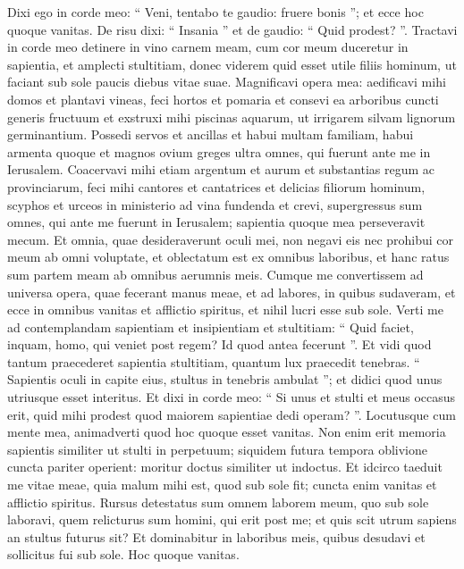 \begin{biblechapter}
\begin{biblechapter}
\verse Dixi ego in corde meo: “ Veni, tentabo te gaudio: fruere bonis ”; et ecce hoc quoque vanitas.
 \verse De risu dixi: “ Insania ”
 et de gaudio: “ Quid prodest? ”.
 \verse Tractavi in corde meo detinere in vino carnem meam, cum cor meum duceretur in sapientia, et amplecti stultitiam, donec viderem quid esset utile filiis hominum, ut faciant sub sole paucis diebus vitae suae. 
\verse Magnificavi opera mea: aedificavi mihi domos et plantavi vineas, 
\verse feci hortos et pomaria et consevi ea arboribus cuncti generis fructuum 
\verse et exstruxi mihi piscinas aquarum, ut irrigarem silvam lignorum germinantium. 
\verse Possedi servos et ancillas et habui multam familiam, habui armenta quoque et magnos ovium greges ultra omnes, qui fuerunt ante me in Ierusalem. 
\verse Coacervavi mihi etiam argentum et aurum et substantias regum ac provinciarum, feci mihi cantores et cantatrices et delicias filiorum hominum, scyphos et urceos in ministerio ad vina fundenda 
\verse et crevi, supergressus sum omnes, qui ante me fuerunt in Ierusalem; sapientia quoque mea perseveravit mecum. 
\verse Et omnia, quae desideraverunt oculi mei, non negavi eis nec prohibui cor meum ab omni voluptate, et oblectatum est ex omnibus laboribus, et hanc ratus sum partem meam ab omnibus aerumnis meis. 
\verse Cumque me convertissem ad universa opera, quae fecerant manus meae, et ad labores, in quibus sudaveram, et ecce in omnibus vanitas et afflictio spiritus, et nihil lucri esse sub sole.
 \verse Verti me ad contemplandam sapientiam et insipientiam et stultitiam: “ Quid faciet, inquam, homo, qui veniet post regem? Id quod antea fecerunt ”. 
\verse Et vidi quod tantum praecederet sapientia stultitiam, quantum lux praecedit tenebras.
 \verse “ Sapientis oculi in capite eius,
 stultus in tenebris ambulat ”;
 et didici quod unus utriusque
 esset interitus.
 \verse Et dixi in corde meo: “ Si unus et stulti et meus occasus erit, quid mihi prodest quod maiorem sapientiae dedi operam? ”. Locutusque cum mente mea, animadverti quod hoc quoque esset vanitas. 
\verse Non enim erit memoria sapientis similiter ut stulti in perpetuum; siquidem futura tempora oblivione cuncta pariter operient: moritur doctus similiter ut indoctus.
 \verse Et idcirco taeduit me vitae meae, quia malum mihi est, quod sub sole fit; cuncta enim vanitas et afflictio spiritus. 
\verse Rursus detestatus sum omnem laborem meum, quo sub sole laboravi, quem relicturus sum homini, qui erit post me; 
\verse et quis scit utrum sapiens an stultus futurus sit? Et dominabitur in laboribus meis, quibus desudavi et sollicitus fui sub sole. Hoc quoque vanitas. 

\end{biblechapter}
\end{biblechapter}
